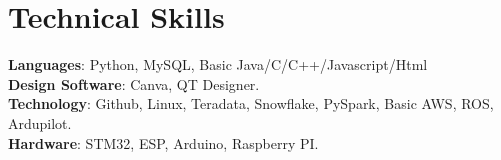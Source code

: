 \section{Technical Skills}
    \begin{itemize}[leftmargin=0.15in, label={}]
	\small{\item{
		\textbf{Languages}{: Python, MySQL, Basic Java/C/C++/Javascript/Html} \\
		\textbf{Design Software}{: Canva, QT Designer.} \\
		\textbf{Technology}{: Github, Linux, Teradata, Snowflake, PySpark, Basic AWS, ROS, Ardupilot.} \\
        \textbf{Hardware}{: STM32, ESP, Arduino, Raspberry PI.} \\
	}}
    \end{itemize}


